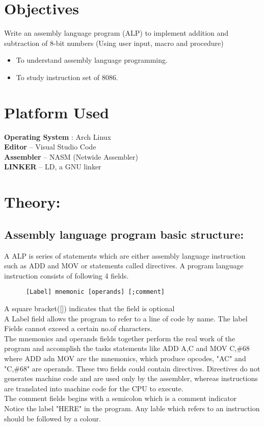 \documentclass[11pt]{article}
\begin{document}
\tableofcontents
\thispagestyle{empty}
\clearpage


\setcounter{page}{1}
\section{Objectives}
Write an assembly language program (ALP) to implement addition and subtraction of 8-bit numbers (Using user input, macro and procedure)

\begin{itemize}
	\item To understand assembly language programming. 
	\item To study instruction set of 8086. 
\end{itemize}

\section{Platform Used}
\textbf{Operating System} : Arch Linux\\
\textbf{Editor} – Visual Studio Code\\
\textbf{Assembler} – NASM (Netwide Assembler)\\
\textbf{LINKER} – LD, a GNU linker


\section{\textbf{Theory:}}
\subsection{\textbf{Assembly language program basic structure:}}
A ALP is series of statements which are either assembly language instruction such as ADD and MOV or statements called directives. A program language instruction consists of following 4 fields.\\
\begin{verbatim}
      [Label] mnemonic [operands] [;comment]
\end{verbatim}

A square bracket([]) indicates that the field is optional\\
A Label field allows the program to refer to a line of code by name. The label Fields cannot exceed a certain no.of characters.\\
The mnemonics and operands fields together perform the real work of the program and accomplish the tasks statements like ADD A,C and MOV C,\#68 where ADD adn MOV are the mnemonics, which produce opcodes, "AC" and "C,\#68" are operands. These two fields could contain directives. Directives do not generates machine code and are used only by the assembler, whereas instructions are translated into machine code for the CPU to execute.\\
The comment fields begins with a semicolon which is a comment indicator\\
Notice the label "HERE" in the program. Any lable which refers to an instruction should be followed by a colour. 
\end{document}
